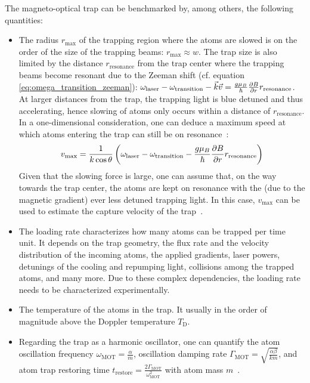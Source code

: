 The magneto-optical trap can be benchmarked by, among others, the following quantities:
\begin{itemize}
    \item The radius $r_\text{max}$ of the trapping region where the atoms are slowed  is on the order of the size of the trapping beams: $r_\text{max} \approx w$. The trap size is also limited by the distance $r_\text{resonance}$ from the trap center where the trapping beams become resonant due to the Zeeman shift (cf. equation \ref{eq:omega_transition_zeeman}): $\omega_\text{laser} - \omega_\text{transition} - \vec k \vec v = \frac{g \mu_B}{\hbar} \pdv{B}{r} r_\text{resonance}$. At larger distances from the trap, the trapping light is blue detuned and thus accelerating, hence slowing of atoms only occurs within a distance of $r_\text{resonance}$. In a one-dimensional consideration, one can deduce a maximum speed at which atoms entering the trap can still be on resonance~\cite{tiecke_high-flux_2009}:
    \begin{align}
        v_\text{max} = \frac{1}{k \cos \theta}\left(\omega_\text{laser} - \omega_\text{transition} - \frac{g \mu_B}{\hbar} \pdv{B}{r} r_\text{resonance}\right)
    \end{align}
    Given that the slowing force is large, one can assume that, on the way towards the trap center, the atoms are kept on resonance with the (due to the magnetic gradient) ever less detuned trapping light. In this case, $v_\text{max}$ can be used to estimate the capture velocity of the trap~\cite{tiecke_high-flux_2009}.
    \item The loading rate characterizes how many atoms can be trapped per time unit. It depends on the trap geometry, the flux rate and the velocity distribution of the incoming atoms, the applied gradients, laser powers, detunings of the cooling and repumping light, collisions among the trapped atoms, and many more. Due to these complex dependencies, the loading rate needs to be characterized experimentally.
    \item The temperature of the atoms in the trap. It usually in the order of magnitude above the Doppler temperature $T_\text{D}$.
    \item Regarding the trap as a harmonic oscillator, one can quantify the atom oscillation frequency $\omega_\text{MOT} = \frac{\alpha}{m}$, oscillation damping rate $\Gamma_\text{MOT} = \sqrt{\frac{\alpha \beta}{km}}$, and atom trap restoring time $t_\text{restore} = \frac{2\Gamma_\text{MOT}}{\omega_\text{MOT}^2}$ with atom mass $m$~\cite{metcalf_laser_1999}.
\end{itemize}

